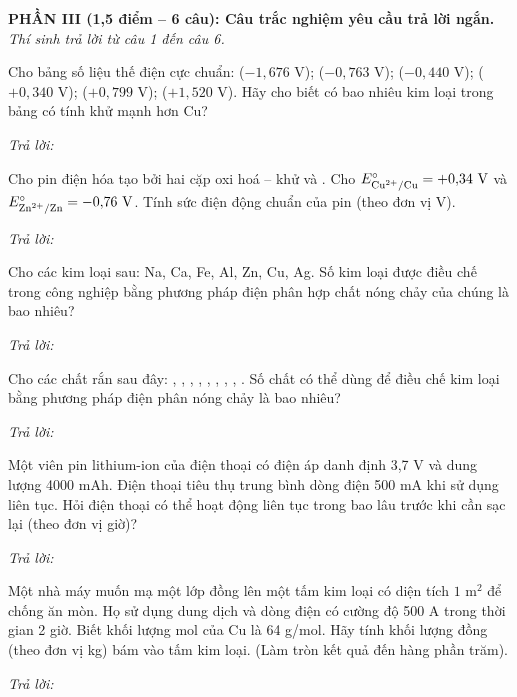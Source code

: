 \documentclass[11pt,a4paper]{article}
\def\loigiai#1{}
\begin{document}
\newpage

\noindent
\textbf{PHẦN III (1,5 điểm -- 6 câu): Câu trắc nghiệm yêu cầu trả lời ngắn.}\\
\textit{Thí sinh trả lời từ câu 1 đến câu 6.}

\setcounter{ex}{0}

\begin{ex}
Cho bảng số liệu thế điện cực chuẩn:  ($-1{,}676\text{ V}$);  ($-0{,}763\text{ V}$);  ($-0{,}440\text{ V}$);  ($+0{,}340\text{ V}$);  ($+0{,}799\text{ V}$);  ($+1{,}520\text{ V}$). Hãy cho biết có bao nhiêu kim loại trong bảng có tính khử mạnh hơn Cu?
\par\noindent\textit{Trả lời:} \dotfill
\loigiai{}
\end{ex}

\begin{ex}
Cho pin điện hóa tạo bởi hai cặp oxi hoá -- khử  và . Cho $E^\circ_{\ce{Cu^2+/Cu}} = +0{,}34\text{ V}$ và $E^\circ_{\ce{Zn^2+/Zn}} = -0{,}76\text{ V}$. Tính sức điện động chuẩn của pin (theo đơn vị V).
\par\noindent\textit{Trả lời:} \dotfill
\loigiai{}
\end{ex}

\begin{ex}
Cho các kim loại sau: Na, Ca, Fe, Al, Zn, Cu, Ag. Số kim loại được điều chế trong công nghiệp bằng phương pháp điện phân hợp chất nóng chảy của chúng là bao nhiêu?
\par\noindent\textit{Trả lời:} \dotfill
\loigiai{}
\end{ex}

\begin{ex}
Cho các chất rắn sau đây: , , , , , , , , . Số chất có thể dùng để điều chế kim loại bằng phương pháp điện phân nóng chảy là bao nhiêu?
\par\noindent\textit{Trả lời:} \dotfill
\loigiai{}
\end{ex}

\begin{ex}
Một viên pin lithium-ion của điện thoại có điện áp danh định 3,7 V và dung lượng 4000 mAh. Điện thoại tiêu thụ trung bình dòng điện 500 mA khi sử dụng liên tục. Hỏi điện thoại có thể hoạt động liên tục trong bao lâu trước khi cần sạc lại (theo đơn vị giờ)?
\par\noindent\textit{Trả lời:} \dotfill
\loigiai{}
\end{ex}

\begin{ex}
Một nhà máy muốn mạ một lớp đồng lên một tấm kim loại có diện tích $1\text{ m}^2$ để chống ăn mòn. Họ sử dụng dung dịch  và dòng điện có cường độ 500 A trong thời gian 2 giờ. Biết khối lượng mol của Cu là 64 g/mol. Hãy tính khối lượng đồng (theo đơn vị kg) bám vào tấm kim loại. (Làm tròn kết quả đến hàng phần trăm).
\par\noindent\textit{Trả lời:} \dotfill
\loigiai{}
\end{ex}


\end{document}
